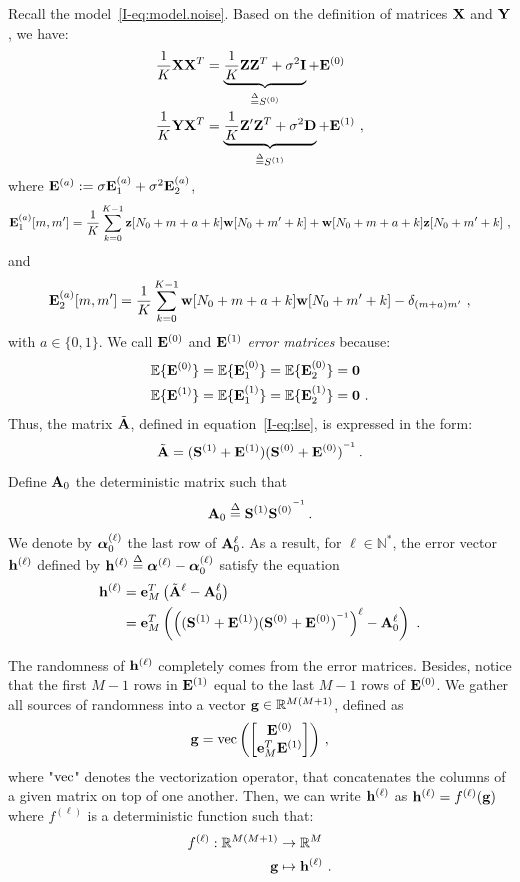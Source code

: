 \documentclass[journal,onecolumn]{IEEEtran}
\begin{document}
Recall the model~\eqref{I-eq:model.noise}. Based on the definition of matrices $\bX$ and $\bY$, we have:
\begin{align}
\label{eq:XX.T}
\dfrac1K\bX\bX^T &= \underbrace{\dfrac1K\bZ\bZ^T+\sigma^2\bI}_{\defeq S^{(0)}} + \bE^{(0)} \\
\label{eq:YX.T}
\dfrac1K\bY\bX^T &= \underbrace{\dfrac1K\bZ'\bZ^T +\sigma^2\bD}_{\defeq S^{(1)}}+ \bE^{(1)} \ ,
\end{align}
where $\bE^{(a)} := \sigma\bE_1^{(a)} + \sigma^2\bE_2^{(a)}$,
\[
\bE_1^{(a)}[m,m'] = \dfrac1K\sum_{k=0}^{K-1} \bz[N_0+m+a+k]\bw[N_0+m'+k] + \bw[N_0+m+a+k]\bz[N_0+m'+k]\ ,
\]
and
\[
\bE_2^{(a)}[m,m'] =  \dfrac1K\sum_{k=0}^{K-1} \bw[N_0+m+a+k]\bw[N_0+m'+k] - \delta_{(m+a)m'}\ ,
\]
with $a\in\{0,1\}$.
We call $\bE^{(0)}$ and $\bE^{(1)}$ {\em error matrices} because:
\begin{align*}
\EE\{\bE^{(0)}\} &= \EE\{\bE_1^{(0)}\} = \EE\{\bE_2^{(0)}\} = \bzero \\
\EE\{\bE^{(1)}\} &= \EE\{\bE_1^{(1)}\} = \EE\{\bE_2^{(1)}\} = \bzero\ .
\end{align*}
Thus, the matrix $\tilde\bA$, defined in equation~\eqref{I-eq:lse}, is expressed in the form:
\begin{equation*}
\tilde\bA = (\bS^{(1)}+\bE^{(1)})(\bS^{(0)}+\bE^{(0)})^\inv\,.
\end{equation*}
Define $\bA_0$ the deterministic matrix such that
\begin{equation}
\bA_0 \defeq \bS^{(1)}{\bS^{(0)}}^\inv\,.
\label{eq:A0}
\end{equation}
We denote by $\balpha^{(\ell)}_0$ the last row of $\bA_0^\ell$. As a result, for $\ell\in \mathbb{N}^*$, the error vector $\bh^{(\ell)}$ defined by $\bh^{(\ell)}\defeq \balpha^{(\ell)} - \balpha^{(\ell)}_0$ satisfy the equation
\begin{align}
\nonumber
\bh^{(\ell)} &= \be_M^T\left(\tilde\bA^\ell-\bA_0^\ell\right) \\
&= \be_M^T\left(\left((\bS^{(1)}+\bE^{(1)})(\bS^{(0)}+\bE^{(0)})^\inv\right)^\ell- \bA_0^\ell\right)\ .
\label{eq:error.vec}
\end{align}

The randomness of $\bh^{(\ell)}$ completely comes from the error matrices. Besides, notice that the first $M-1$ rows in $\bE^{(1)}$ equal to the last $M-1$ rows of $\bE^{(0)}$. We gather all sources of randomness into a vector $\bg\in\RR^{M(M+1)}$, defined as
\begin{equation}
\bg = \vec\left(
\begin{bmatrix}
\bE^{(0)} \\
\be_M^T\bE^{(1)}
\end{bmatrix}
\right)\,,
\label{eq:vec}
\end{equation}
where "$\vec$" denotes the vectorization operator, that concatenates the columns of a given matrix on top of one another. Then, we can write $\bh^{(\ell)}$ as $\bh^{(\ell)}=f^{(\ell)}(\bg)$ where $f^{(\ell)}$ is a deterministic function such that:
\begin{align}
\nonumber
f^{(\ell)} : \RR^{M(M+1)} &\to \RR^{M} \\
 \bg &\mapsto \bh^{(\ell)}\ .
\label{eq:f.ell}
\end{align}
\end{document}
